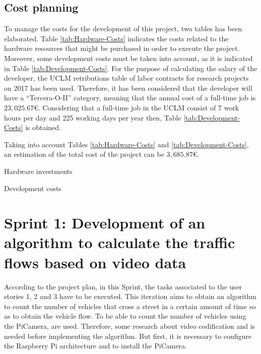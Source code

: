 \subsection{Cost planning}
To manage the costs for the development of this project, two tables has been elaborated. Table \ref{tab:Hardware-Costs} indicates the costs related to the hardware resources that might be purchased in order to execute the project. Moreover, some development costs must be taken into account, as it is indicated in Table \ref{tab:Development-Costs}. For the purpose of calculating the salary of the developer, the \ac{UCLM} retributions table of labor contracts for research projects on 2017 has been used. Therefore, it has been considered that the developer will have a “Tercera-O-II” category, meaning that the annual cost of a full-time job is $23,025.67$\euro{}. Considering that a full-time job in the UCLM consist of 7 work hours per day and 225 working days per year then, Table \ref{tab:Development-Costs} is obtained. 

Taking into account Tables \ref{tab:Hardware-Costs} and \ref{tab:Development-Costs}, an estimation of the total cost of the project can be $3,685.87$\euro{}.

\begin{table}[hp]
	\centering
	{\small
		
	}
	\caption{Hardware investments}
	\label{tab:Hardware-Costs}
\end{table}

\begin{table}[hp]
	\centering
	{\small
		
	}
	\caption{Development costs}
	\label{tab:Development-Costs}
\end{table}


\newpage
\section{Sprint 1: Development of an algorithm to calculate the traffic flows based on video data}
\label{Section:Sprint1}
According to the project plan, in this Sprint, the tasks associated to the user stories 1, 2 and 3 have to be executed. This iteration aims to obtain an algorithm to count the number of vehicles that cross a street in a certain amount of time so as to obtain the vehicle flow. To be able to count the number of vehicles using the PiCamera,  are used. Therefore, some research about video codification and  is needed before implementing the algorithm. But first, it is necessary to configure the Raspberry Pi architecture and to install the PiCamera. 

